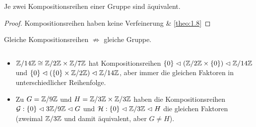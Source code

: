 \documentclass[../main.tex]{subfiles}
\begin{document}
\begin{theorem}
    Je zwei Kompositionsreihen einer Gruppe sind äquivalent.
\end{theorem}
\begin{proof}
    Kompositionsreihen haben keine Verfeinerung \& \ref{theo:1.8}
\end{proof}
\begin{remark*}
    Gleiche Kompositionsreihen $\not\Rightarrow$ gleiche Gruppe.
\end{remark*}
\begin{example*} $ $
    \begin{itemize}
        \item $\mathbb{Z}/14\mathbb{Z} \cong \mathbb{Z}/2\mathbb{Z} \times \mathbb{Z}/7\mathbb{Z}$ hat Kompositionsreihen $\{0\} \vartriangleleft (\mathbb{Z}/2\mathbb{Z} \times \{0\}) \vartriangleleft \mathbb{Z}/14\mathbb{Z}$ und $\{0\} \vartriangleleft (\{0\} \times \mathbb{Z}/2\mathbb{Z}) \vartriangleleft \mathbb{Z}/14\mathbb{Z}$, aber immer die gleichen Faktoren in unterschiedlicher Reihenfolge.
        \item Zu $G=\mathbb{Z}/9\mathbb{Z}$ und $H=\mathbb{Z}/3\mathbb{Z}\times\mathbb{Z}/3\mathbb{Z}$ haben die Kompositionsreihen $\mathcal{G}: \{0\} \vartriangleleft 3 \mathbb{Z}/9\mathbb{Z} \vartriangleleft G$ und $\mathcal{H}: \{0\} \vartriangleleft \mathbb{Z}/3\mathbb{Z} \vartriangleleft H$ die gleichen Faktoren (zweimal $\mathbb{Z}/3\mathbb{Z}$ und damit äquivalent, aber $G\neq H$).
    \end{itemize}
\end{example*}
    
\end{document}
